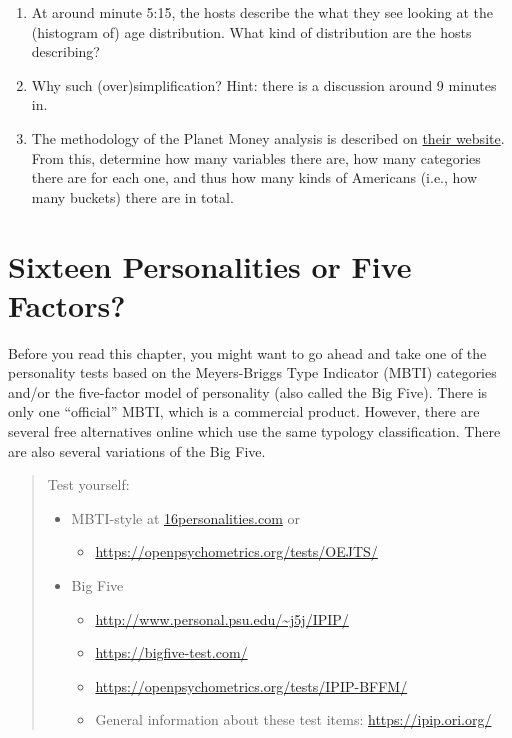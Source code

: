 \documentclass[
  openany]{book}
\providecommand{\tightlist}{%
  \setlength{\itemsep}{0pt}\setlength{\parskip}{0pt}}
\begin{document}
\begin{enumerate}
\def\labelenumi{\arabic{enumi}.}
\tightlist
\item
  At around minute 5:15, the hosts describe the what they see looking at the (histogram of) age distribution. What kind of distribution are the hosts describing?
\item
  Why such (over)simplification? Hint: there is a discussion around 9 minutes in.
\item
  The methodology of the Planet Money analysis is described on \href{https://www.npr.org/2019/08/28/755191639/episode-936-the-modal-american}{their website}. From this, determine how many variables there are, how many categories there are for each one, and thus how many kinds of Americans (i.e., how many buckets) there are in total.
\end{enumerate}

\hypertarget{sixteen-personalities-or-five-factors}{%
\chapter{Sixteen Personalities or Five Factors?}\label{sixteen-personalities-or-five-factors}}

Before you read this chapter, you might want to go ahead and take one of the personality tests based on
the Meyers-Briggs Type Indicator (MBTI) categories and/or the five-factor model of personality (also called the Big Five). There is only one ``official'' MBTI, which is a commercial product. However, there are several free alternatives online which use the same typology classification. There are also several variations of the Big Five.

\begin{quote}
Test yourself:

\begin{itemize}
\tightlist
\item
  MBTI-style at \url{16personalities.com} or

  \begin{itemize}
  \tightlist
  \item
    \url{https://openpsychometrics.org/tests/OEJTS/}
  \end{itemize}
\item
  Big Five

  \begin{itemize}
  \tightlist
  \item
    \url{http://www.personal.psu.edu/~j5j/IPIP/}
  \item
    \url{https://bigfive-test.com/}
  \item
    \url{https://openpsychometrics.org/tests/IPIP-BFFM/}
  \item
    General information about these test items: \url{https://ipip.ori.org/}
  \end{itemize}
\end{itemize}
\end{quote}
\end{document}
